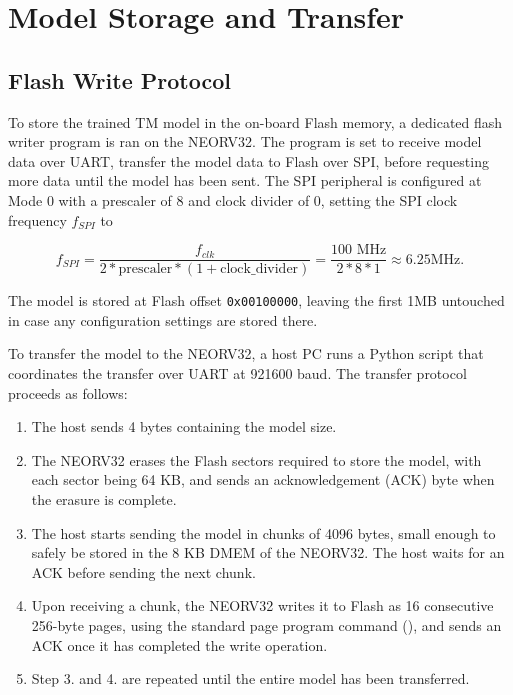 \section{Model Storage and Transfer}
\label{sec:model_storage}

\subsection{Flash Write Protocol}
\label{sec:flash_write}

To store the trained TM model in the on-board Flash memory, a dedicated flash writer program is ran on the NEORV32. The program is set to receive model data over UART, transfer the model data to Flash over SPI, before requesting more data until the model has been sent. The SPI peripheral is configured at Mode 0 with a prescaler of 8 and clock divider of 0, setting the SPI clock frequency $f_{SPI}$ to 

\begin{equation}
    f_{SPI} = \frac{f_{clk}}{2 * \textrm{prescaler} * (1 + \textrm{clock\_divider})} = \frac{100\text{ MHz}}{2 * 8 * 1} \approx 6.25 \text{MHz}.
\label{eq:spi_freq}
\end{equation}

The model is stored at Flash offset \texttt{0x00100000}, leaving the first 1MB untouched in case any configuration settings are stored there.

To transfer the model to the NEORV32, a host PC runs a Python script that coordinates the transfer over UART at 921600 baud. The transfer protocol proceeds as follows:

\begin{enumerate}
    \item The host sends 4 bytes containing the model size.
    \item The NEORV32 erases the Flash sectors required to store the model, with each sector being 64 KB, and sends an acknowledgement (ACK) byte when the erasure is complete.
    \item The host starts sending the model in chunks of 4096 bytes, small enough to safely be stored in the 8 KB DMEM of the NEORV32. The host waits for an ACK before sending the next chunk.
    \item Upon receiving a chunk, the NEORV32 writes it to Flash as 16 consecutive 256-byte pages, using the standard page program command (\cite{infineon_s25fl127s}), and sends an ACK once it has completed the write operation.
    \item Step 3. and 4. are repeated until the entire model has been transferred. 
\end{enumerate}

